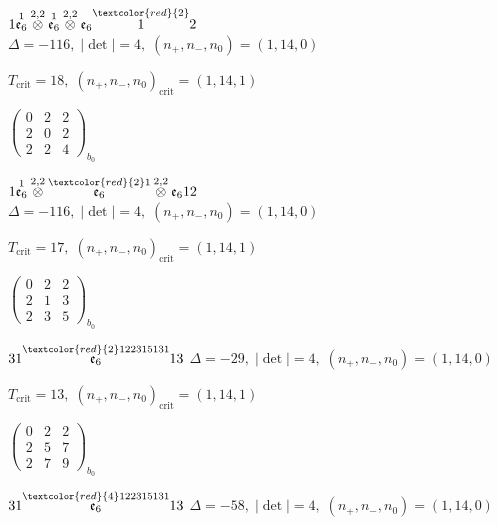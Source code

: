 \documentclass[10pt]{article}
\begin{document}
\smallskip

$1\overset{1}{\mathfrak{e}_6}\overset{2,2}{\otimes}\overset{1}{\mathfrak{e}_6}\overset{2,2}{\otimes}\mathfrak{e}_6\overset{\textcolor{red}{2}}{1}2$ \quad $\Delta=-116,\; |\det|=4,\; (n_+,n_-,n_0)=(1,14,0)$

\hspace{1em}$T_{\text{crit}}=18,\; (n_+,n_-,n_0)_{\text{crit}}=(1,14,1)$

\hspace{2em}$\left(\begin{smallmatrix}0 & 2 & 2 \\ 2 & 0 & 2 \\ 2 & 2 & 4\end{smallmatrix}\right)_{\!b_0}$

$1\overset{1}{\mathfrak{e}_6}\overset{2,2}{\otimes}\overset{\textcolor{red}{2}1}{\mathfrak{e}_6}\overset{2,2}{\otimes}\mathfrak{e}_612$ \quad $\Delta=-116,\; |\det|=4,\; (n_+,n_-,n_0)=(1,14,0)$

\hspace{1em}$T_{\text{crit}}=17,\; (n_+,n_-,n_0)_{\text{crit}}=(1,14,1)$

\hspace{2em}$\left(\begin{smallmatrix}0 & 2 & 2 \\ 2 & 1 & 3 \\ 2 & 3 & 5\end{smallmatrix}\right)_{\!b_0}$

\smallskip

$31\overset{\textcolor{red}{2}122315131}{\mathfrak{e}_6}13$ \quad $\Delta=-29,\; |\det|=4,\; (n_+,n_-,n_0)=(1,14,0)$

\hspace{1em}$T_{\text{crit}}=13,\; (n_+,n_-,n_0)_{\text{crit}}=(1,14,1)$

\hspace{2em}$\left(\begin{smallmatrix}0 & 2 & 2 \\ 2 & 5 & 7 \\ 2 & 7 & 9\end{smallmatrix}\right)_{\!b_0}$

$31\overset{\textcolor{red}{4}122315131}{\mathfrak{e}_6}13$ \quad $\Delta=-58,\; |\det|=4,\; (n_+,n_-,n_0)=(1,14,0)$
\end{document}
